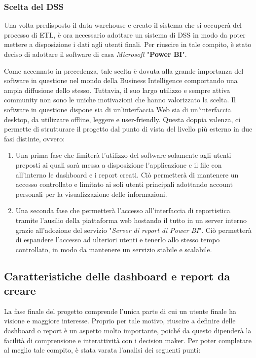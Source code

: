 \subsubsection{Scelta del DSS}

Una volta predisposto il data warehouse e creato il sistema che si occuperà del processo di ETL, è ora necessario adottare un sistema di DSS in modo da poter mettere a disposizione i dati agli utenti finali. Per riuscire in tale compito, è stato deciso di adottare il software di casa \textit{Microsoft} "\textbf{Power BI}". 

Come accennato in precedenza, tale scelta è dovuta alla grande importanza del software in questione nel mondo della Business Intelligence comportando una ampia diffusione dello stesso. Tuttavia, il suo largo utilizzo e sempre attiva community non sono le uniche motivazioni che hanno valorizzato la scelta. Il software in questione dispone sia di un'interfaccia Web sia di un'interfaccia desktop, da utilizzare offline, leggere e user-friendly. Questa doppia valenza, ci permette di strutturare il progetto dal punto di vista del livello più esterno in due fasi distinte, ovvero: 

\begin{enumerate}
    \item Una prima fase che limiterà l'utilizzo del software solamente agli utenti preposti ai quali sarà messa a disposizione l'applicazione e il file con all'interno le dashboard e i report creati. Ciò permetterà di mantenere un accesso controllato e limitato ai soli utenti principali adottando account personali per la visualizzazione delle informazioni.
    \item Una seconda fase che permetterà l'accesso all'interfaccia di reportistica tramite l'ausilio della piattaforma web hostando il tutto in un server interno grazie all'adozione del servizio "\textit{Server di report di Power BI}". Ciò permetterà di espandere l'accesso ad ulteriori utenti e tenerlo allo stesso tempo controllato, in modo da mantenere un servizio stabile e scalabile.
\end{enumerate}

\subsection{Caratteristiche delle dashboard e report da creare}

La fase finale del progetto comprende l'unica parte di cui un utente finale ha visione e maggiore interesse. Proprio per tale motivo, riuscire a definire delle dashboard o report è un aspetto molto importante, poiché da questo dipenderà la facilità di comprensione e interattività con i decision maker. Per poter completare al meglio tale compito, è stata varata l'analisi dei seguenti punti:

